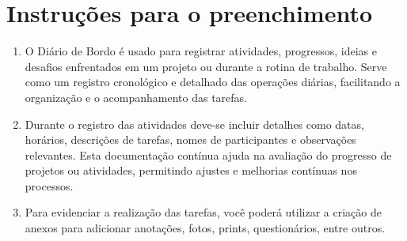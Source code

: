 \documentclass[
landscape,
  a4paper,
  12pt,
  english,
  brazilian,
]{article}
\begin{document}
\section*{Instruções para o preenchimento}
\doublespacing
\begin{enumerate}
    \item O Diário de Bordo é usado para registrar atividades, progressos, ideias e desafios enfrentados em um projeto ou durante a rotina de trabalho. Serve como um registro cronológico e detalhado das operações diárias, facilitando a organização e o acompanhamento das tarefas.
    \doublespacing
    \item Durante o registro das atividades deve-se incluir detalhes como datas, horários, descrições de tarefas, nomes de participantes e observações relevantes.  Esta documentação contínua ajuda na avaliação do progresso de projetos ou atividades, permitindo ajustes e melhorias contínuas nos processos.
    \doublespacing
    \item Para evidenciar a realização das tarefas, você poderá utilizar a criação de anexos para adicionar anotações, fotos, prints, questionários, entre outros.
\end{enumerate}
\end{document}
